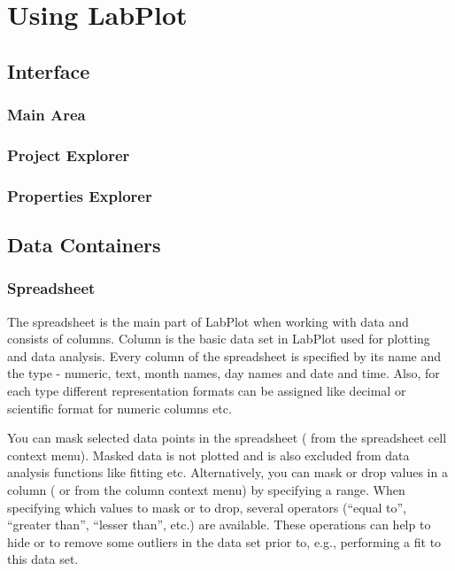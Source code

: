 \part{Using LabPlot}

\chapter{Interface}
\section{Main Area}
\section{Project Explorer}
\section{Properties Explorer}

\chapter{Data Containers}
\section{Spreadsheet}
The spreadsheet is the main part of LabPlot when working with data and consists of columns.
Column is the basic data set in LabPlot used for plotting and data analysis.
Every column of the spreadsheet is specified by its name and the type - numeric, text, month names, day names and date and time.
Also, for each type different representation formats can be assigned like decimal or scientific format for numeric columns etc.

You can mask selected data points in the spreadsheet ( from the spreadsheet cell context menu).
Masked data is not plotted and is also excluded from data analysis functions like fitting etc.
Alternatively, you can mask or drop values in a column ( or  from the column context menu) by specifying a range.
When specifying which values to mask or to drop, several operators (“equal to”, “greater than”, “lesser than”, etc.) are available.
These operations can help to hide or to remove some outliers in the data set prior to, e.g., performing a fit to this data set.

